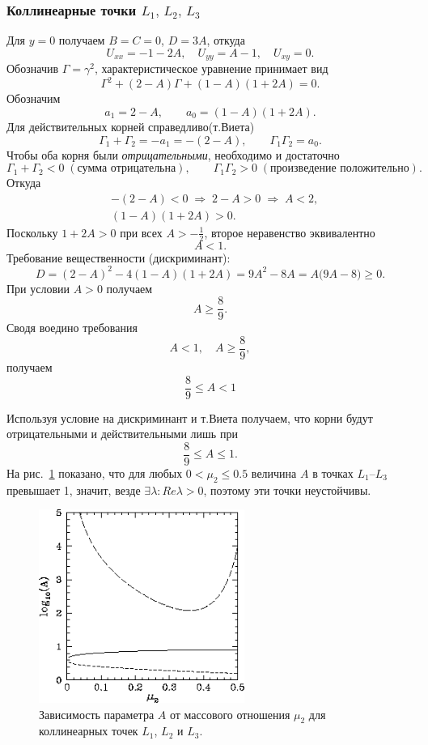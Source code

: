 \documentclass[12pt]{article}
\newcommand{\mutwo}{\mu_2}
\begin{document}
\subsubsection{Коллинеарные точки $L_1,\,L_2,\,L_3$}
Для $y=0$ получаем $B=C=0$, $D=3A$, откуда
\begin{equation}\label{eq:Ucol}\tag{*}
  U_{xx}=-1-2A,\quad U_{yy}=A-1,\quad U_{xy}=0.
\end{equation}
Обозначив $\Gamma=\gamma^{2}$, характеристическое уравнение принимает вид
\begin{equation}\tag{1113}
  \Gamma^{2}+(2-A)\Gamma+(1-A)(1+2A)=0.
\end{equation}
Обозначим
\[
a_1=2-A,\qquad a_0=(1-A)(1+2A).
\]
Для действительных корней справедливо(т.Виета)
\[
\Gamma_1+\Gamma_2=-a_1=-(2-A),\qquad \Gamma_1\Gamma_2=a_0.
\]
Чтобы оба корня были \emph{отрицательными}, необходимо и достаточно
\[
\Gamma_1+\Gamma_2<0\;(\text{сумма отрицательна}),\qquad \Gamma_1\Gamma_2>0\;(\text{произведение положительно}).
\]
Откуда
\begin{align}
&-(2-A)<0\;\Longrightarrow\;2-A>0\;\Longrightarrow\;A<2,\\[4pt]
&(1-A)(1+2A)>0.
\end{align}
Поскольку \(1+2A>0\) при всех \(A>-\tfrac12\), второе неравенство эквивалентно
\[ A<1. \]
Требование вещественности (дискриминант):
\begin{equation}
D=(2-A)^2-4(1-A)(1+2A)=9A^{2}-8A=A\bigl(9A-8\bigr)\ge0.
\end{equation}
При условии \(A>0\) получаем 
\[ A\ge\frac89. \]
Сводя воедино требования
\[ A<1,\quad A\ge\frac89, \]
получаем 
\begin{equation}
\frac89\le A<1
\end{equation}


Используя условие на дискриминант и т.Виета получаем, что корни будут отрицательными и действительными лишь при
\begin{equation}\tag{1115}
  \frac{8}{9}\le A\le1.
\end{equation}
На рис.~\ref{fig:A_vs_mu} показано, что для любых $0<\mutwo\le0.5$ величина $A$ в точках $L_1$–$L_3$ превышает 1, значит, везде $\exists\lambda:Re\lambda > 0$, поэтому эти точки неустойчивы.

\begin{figure}[H]
  \centering
  \includegraphics[width=0.6\textwidth]{image2.png}
  \caption{Зависимость параметра $A$ от массового отношения $\mutwo$ для коллинеарных точек $L_1$, $L_2$ и $L_3$.}
  \label{fig:A_vs_mu}
\end{figure}
\end{document}
